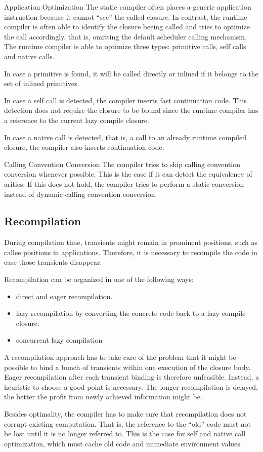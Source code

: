 \begin{paragraph}{Application Optimization}
The static compiler often places a generic application instruction because
it cannot ``see'' the called closure.
In contrast, the runtime compiler is often able to identify the closure beeing
called and tries to optimize the call accordingly, that is, omitting
the default scheduler calling mechanism. The runtime compiler is able to
optimize three types: primitive calls, self calls and native calls.

In case a primitive is found, it will be called directly or inlined if it
belongs to the set of inlined primitives.

In case a self call is detected, the compiler inserts fast continuation code.
This detection does not require the closure to be bound since the runtime
compiler has a reference to the current lazy compile closure.

In case a native call is detected, that is, a call to an already runtime
compiled closure, the compiler also inserts continuation code.
\end{paragraph}
\begin{paragraph}{Calling Convention Conversion}
The compiler tries to skip
calling convention conversion whenever possible. This is the case if it
can detect the equivalency of arities.
If this does not hold, the compiler tries to perform a static
conversion instead of dynamic calling convention conversion.
\end{paragraph}
\subsection{Recompilation}
During compilation time, transients might remain in prominent positions,
such as callee positions in applications.
Therefore, it is necessary to recompile
the code in case those transients disappear.

Recompilation can be organized in one of the following ways:
\begin{itemize}
\item direct and eager recompilation.
\item lazy recompilation by converting the concrete code back to a lazy
compile closure.
\item concurrent lazy compilation
\end{itemize}
A recompilation approach has
to take care of the problem that it might be possible to bind a bunch
of transients within one execution of the closure body.
Eager recompilation after each transient binding
is therefore unfeasible. Instead, a heuristic to choose a good point
is necessary. The longer recompilation is delayed, the better the
profit from newly achieved information might be.

Besides optimality, the compiler has to make sure that recompilation
does not corrupt existing computation. That is, the reference to the
``old'' code must not be lost until it is no longer referred to.
This is the case for self and native call optimization, which
must cache old code and immediate environment values.